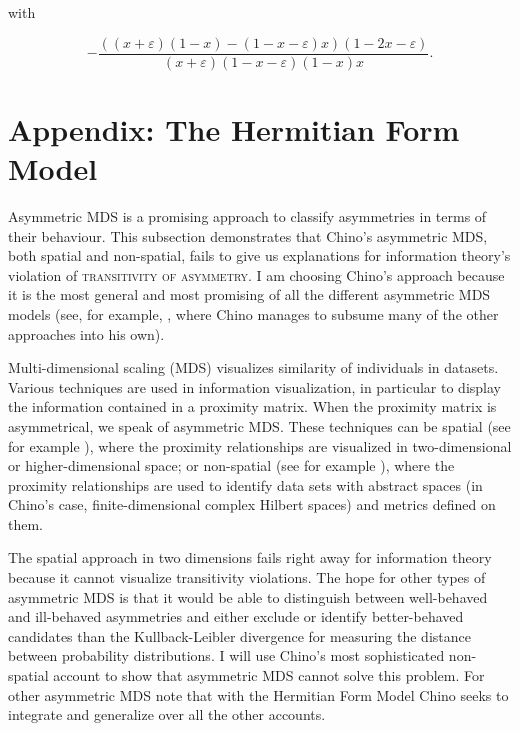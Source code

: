 \documentclass[11pt]{article}
\begin{document}
with

\begin{equation}
  \label{eq:lpder}
  -\frac{{\left({\left(x + \varepsilon\right)} {\left(1 - x\right)} - {\left(1 - x - \varepsilon\right)} x\right)} {\left(1-2x-\varepsilon\right)}}{{\left(x + \varepsilon\right)} {\left(1-x-\varepsilon\right)} {\left(1-x\right)} x}.
\end{equation}

\section{Appendix: The Hermitian Form Model}
\label{app:eekiquom}

Asymmetric MDS is a promising approach to classify asymmetries in
terms of their behaviour. This subsection demonstrates that Chino's
asymmetric MDS, both spatial and non-spatial, fails to give us
explanations for information theory's violation of
\textsc{transitivity of asymmetry}. I am choosing Chino's approach
because it is the most general and most promising of all the different
asymmetric MDS models (see, for example, ,
where Chino manages to subsume many of the other approaches into his
own).

Multi-dimensional scaling (MDS) visualizes similarity of individuals
in data\-sets. Various techniques are used in information visualization,
in particular to display the information contained in a proximity
matrix. When the proximity matrix is asymmetrical, we speak of
asymmetric MDS. These techniques can be spatial (see for example
), where the proximity relationships are
visualized in two-dimensional or higher-dimensional space; or
non-spatial (see for example ), where the
proximity relationships are used to identify data sets with abstract
spaces (in Chino's case, finite-dimensional complex Hilbert spaces)
and metrics defined on them.

The spatial approach in two dimensions fails right away for
information theory because it cannot visualize transitivity
violations. The hope for other types of asymmetric MDS is that it
would be able to distinguish between well-behaved and ill-behaved
asymmetries and either exclude or identify better-behaved candidates
than the Kullback-Leibler divergence for measuring the distance
between probability distributions. I will use Chino's most
sophisticated non-spatial account to show that asymmetric MDS cannot
solve this problem. For other asymmetric MDS note that with the
Hermitian Form Model Chino seeks to integrate and generalize over all
the other accounts. 
\end{document}
